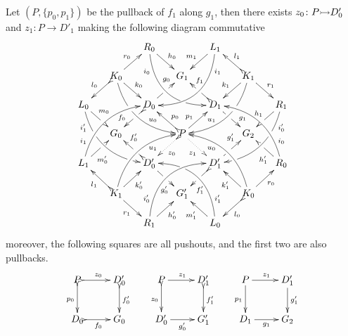 \begin{lemma}
Let $(P, \{p_0, p_1\})$ be the pullback of $f_1$ along $g_1$, then there exists $z_0\colon P\mto D'_0$ and $z_1\colon P\to D'_1$ making the following diagram commutative
\[\xymatrix@C=15pt@R=15pt{&&R_0 \ar@/_.8cm/[ddrr]_(.2){i_0}|(.7)\hole
	\ar[dr]^{h_0}&& L_1\ar@/^.8cm/[ddll]^(.2){i_1}
	\ar[dl]_{m_1}\\&K_0\ar[dr]^{k_0}\ar@{>->}[dl]_{l_0}
	\ar@/_.6cm/[ddrr]|(.36)\hole^(.65){u_0}\ar[ur]^{r_0}&& G_1 &&
	K_1
	\ar@/^.6cm/[ddll]|(.36)\hole_(.65){u_1}\ar[dl]_{k_1}\ar@{>->}[lu]_{l_1}
	\ar[dr]^{r_1}\\L_0
	\ar@/_.6cm/[ddrr]_(.2){i'_1}|(.31)\hole|(.81)\hole
	\ar[dr]^(.4){m_0}|(.61)\hole && D_0
	\ar@{>->}[dl]|(.4)\hole_(.65){f_0}\ar[ur]|(.5)\hole^(.7){g_0}&&D_1
	\ar[dr]|(.4)\hole^(.65){g_1}
	\ar@{>->}[ul]|(.5)\hole_(.65){f_1}&&R_1\ar@/^.6cm/[ddll]^(.2){i'_0}|(.31)\hole|(.81)\hole\ar[dl]_{h_1}|(.6)\hole\\&G_0
	&&P\ar@{.>}[dr]_{z_1}	\ar@{>.>}[dl]^{z_0}\ar[ur]^(.4){p_1}\ar@{>->}[ul]_(.4){p_0}&&G_2\\L_1	\ar@/^.6cm/[uurr]^(.2){i_1} \ar[ur]_(.35){m'_0}|(.61)\hole && D'_0	\ar@{>->}[ul]|(.4)\hole_(.65){f'_0}\ar[dr]|(.5)\hole_(.65){g'_0}	&&D'_1\ar[ur]|(.4)\hole^(.65){g'_1} \ar@{>->}[dl]|(.5)\hole^(.65){f'_1}	&& R_0 \ar[ul]^(.35){h'_1}|(.61)\hole\ar@/_.6cm/[uull]_(.2){i_0}\\ &K_1	\ar[ur]_{k'_0} \ar[dr]_{r_1}	\ar@{>->}[ul]^{l_1}\ar@/^.6cm/[uurr]_(.65){u_1}&&G'_1&& K_0\ar[ur]_{r_0} \ar[ul]^{k'_1} \ar@{>->}[dl]^{l_0} \ar@/_.6cm/[uull]^(.65){u_0}\\&& R_1	\ar[ur]_{h'_0}\ar@/^.8cm/[uurr]^(.2){i'_0}&& L_0 \ar[ul]^{m'_1} \ar@/_.8cm/[uull]_(.2){i'_1} |(.69)\hole }\] 
moreover, the following squares are all pushouts, and the first two are also pullbacks.
\[\xymatrix{P \ar@{>->}[r]^{z_0} \ar@{>->}[d]_{p_0}& D'_0 \ar@{>->}[d]^{f'_0} &  P \ar@{>->}[d]_{z_0} \ar[r]^{z_1} & D'_1 \ar@{>->}[d]^{f'_1} & P\ar[r]^{z_1} \ar[d]_{p_1}&D'_1 \ar[d]^{g'_1}\\ D_0 \ar@{>->}[r]_{f_0} & G_0 & D'_0 \ar[r]_{g'_0}& G'_1 & D_1 \ar[r]_{g_1}& G_2}\]
\end{lemma}
